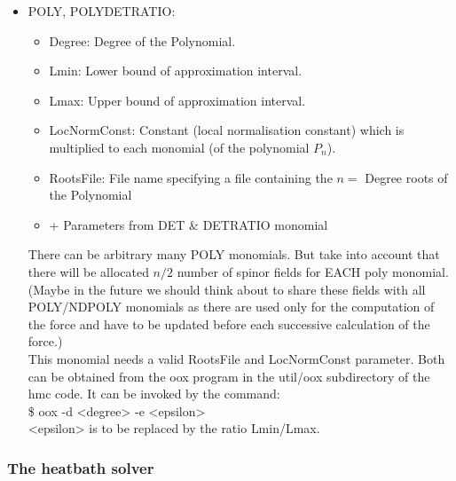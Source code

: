 \begin{itemize}
\item {\ttfamily POLY, POLYDETRATIO}:
  \begin{itemize}
  \item {\ttfamily Degree}:
    Degree of the Polynomial.
  \item {\ttfamily Lmin}:
    Lower bound of approximation interval.
  \item {\ttfamily Lmax}:
    Upper bound of approximation interval.
  \item {\ttfamily LocNormConst}:
    Constant (local normalisation constant) which is multiplied to each monomial (of the polynomial $P_n$).
  \item {\ttfamily RootsFile}:
    File name specifying a file containing the $n=$ {\ttfamily Degree} roots of the Polynomial
  \item {\ttfamily + Parameters from DET \& DETRATIO monomial}
  \end{itemize}
There can be arbitrary many POLY monomials. But take into account that there will be allocated $n/2$ number of spinor fields for EACH poly monomial. (Maybe in the future we should think about to share these fields with all POLY/NDPOLY monomials as there are used only for the computation of the force and have to be updated before each successive calculation of the force.)\\
This monomial needs a valid {\ttfamily RootsFile} and {\ttfamily LocNormConst} parameter. Both can be obtained from the {\ttfamily oox} program in the {\ttfamily util/oox} subdirectory of the hmc code. It can be invoked by the command:\\
{\ttfamily \$ oox -d <degree> -e <epsilon>}\\
{\ttfamily <epsilon>} is to be replaced by the ratio  {\ttfamily Lmin/Lmax}.
\end{itemize}

\subsubsection{The heatbath solver}
\label{sec:hb.solver}

